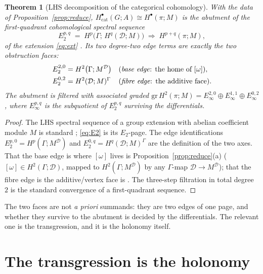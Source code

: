 \documentclass[11pt]{article}
\newtheorem{theorem}{Theorem}
\theoremstyle{definition}
\newcommand{\D}{\mathcal{D}}
\begin{document}
\begin{theorem}[LHS decomposition of the categorical cohomology]\label{thm:lhs}
With the data of Proposition~\ref{prop:reduce}, $H^\bullet_{\mathrm{cat}}(G;A)\cong
H^\bullet(\pi;M)$ is the abutment of the first-quadrant cohomological spectral sequence
\begin{equation}\label{eq:E2}
   E_2^{p,q}\;=\;H^p\bigl(\Gamma;\,H^q(\D;M)\bigr)\;\Longrightarrow\;H^{p+q}(\pi;M),
\end{equation}
of the extension \eqref{eq:ext} \cite[\S6.8]{weibel}. Its two degree-two edge terms are
exactly the two obstruction faces:
\[
   \begin{aligned}
   E_2^{2,0}&=H^2\bigl(\Gamma;M^\D\bigr)
   &&\text{(\emph{base edge}: the home of $[\omega]$)},\\
   E_2^{0,2}&=H^2(\D;M)^\Gamma
   &&\text{(\emph{fibre edge}: the additive face)} .
   \end{aligned}
\]
The abutment is filtered with associated graded
$\mathrm{gr}\,H^2(\pi;M)=E_\infty^{2,0}\oplus E_\infty^{1,1}\oplus E_\infty^{0,2}$,
where $E_\infty^{p,q}$ is the subquotient of $E_2^{p,q}$ surviving the differentials.
\end{theorem}
\begin{proof}
The LHS spectral sequence of a group extension with abelian coefficient module $M$ is
standard \cite[Thm.~6.8.2]{weibel}; \eqref{eq:E2} is its $E_2$-page. The edge
identifications $E_2^{p,0}=H^p(\Gamma;M^\D)$ and $E_2^{0,q}=H^q(\D;M)^\Gamma$ are the
definition of the two axes. That the base edge is where $[\omega]$ lives is
Proposition~\ref{prop:reduce}(a) ($[\omega]\in H^2(\Gamma;\D)$, mapped to $H^2(\Gamma;M^\D)$
by any $\Gamma$-map $\D\to M^\D$); that the fibre edge is the additive/vertex face is
\cite{sep,sep2}. The three-step filtration in total degree $2$ is the standard convergence
of a first-quadrant sequence.
\end{proof}

The two faces are not \emph{a priori} summands: they are two edges of one page, and whether
they survive to the abutment is decided by the differentials. The relevant one is the
transgression, and it is the holonomy itself.

\section{The transgression is the holonomy}\label{sec:tg}
\end{document}
